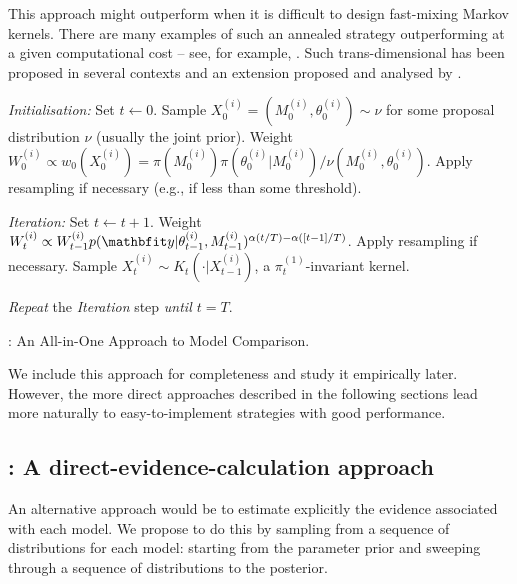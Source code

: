 This approach might outperform \rjmcmc when it is difficult to design
fast-mixing Markov kernels. There are many examples of such an annealed \smc
strategy outperforming \mcmc at a given computational cost -- see, for
example, \cite{Fan:2008tf,Johansen:2008kp,Fearnhead:2010ua}. Such
trans-dimensional \smc has been proposed in several contexts
\cite{Peters:2005wh} and an extension proposed and analysed
by \cite{Jasra:2008bb}.

\begin{algorithm}
\begin{algorithmic}
  \tophrule
  \STATE \emph{Initialisation:} Set $t\leftarrow0$.
  \STATE\STATESKIP Sample $X_0^{(i)} = (M_0^{(i)},\theta_0^{(i)})\sim\nu$
  for some proposal distribution $\nu$ (usually the joint prior).
  \STATE\STATESKIP Weight $W_0^{(i)} \propto w_0(X_0^{(i)}) =
  {\pi(M_0^{(i)}) \pi(\theta^{(i)}_0|M_0^{(i)})}/
  {\nu(M_0^{(i)},\theta_0^{(i)})}$.
  \STATE\STATESKIP Apply resampling if necessary (e.g., if \ess
  \cite{Kong:1994ul} less than some threshold).

  \STATE \emph{Iteration:} Set $t\leftarrow t + 1$.
  \STATE\STATESKIP Weight $W_t^{(i)} \propto W_{t-1}^{(i)}
  p(\data|\theta_{t-1}^{(i)},M_{t-1}^{(i)})^{\alpha(t/T) - \alpha([t-1]/T)}$.
  \STATE\STATESKIP Apply resampling if necessary.
  \STATE\STATESKIP Sample $X_t^{(i)} \sim K_t(\cdot|X_{t-1}^{(i)})$, a
  $\pi_t^{(1)}$-invariant kernel.

  \STATE \emph{Repeat} the \emph{Iteration} step \emph{until $t = T$}.
  \bottomhrule
\end{algorithmic}
\caption{\smc[1]: An All-in-One Approach to Model Comparison.}
\label{alg:smc1}
\end{algorithm}

We include this approach for completeness and study it empirically later.
However, the more direct approaches described in the following sections lead
more naturally to easy-to-implement strategies with good performance.

\subsection{\smc[2]: A direct-evidence-calculation approach}
\label{sub:smc2: A direct-evidence-calculation approach}

An alternative approach would be to estimate explicitly the evidence
associated with each model. We propose to do this by sampling from a sequence
of distributions for each model: starting from the parameter prior and
sweeping through a sequence of distributions to the posterior.

